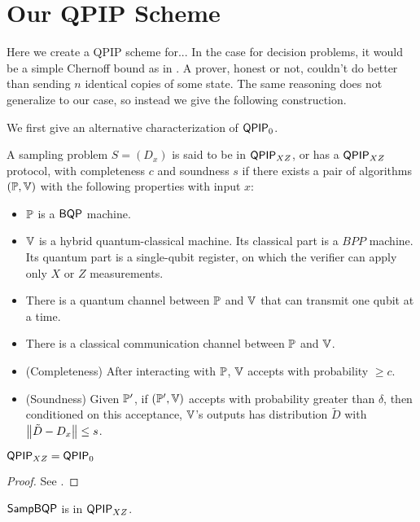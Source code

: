 \section{Our QPIP Scheme}

Here we create a QPIP scheme for...  In the case for decision problems, it would be a simple Chernoff bound as in \cite{kitaev2002classical}. A prover, honest or not, couldn't do better than sending $n$ identical copies of some state. The same reasoning does not generalize to our case, so instead we give the following construction.

We first give an alternative characterization of $\operatorname{\mathsf{QPIP}}_0$.

\begin{definition}
	A sampling problem $S=(D_x)$ is said to be in $\operatorname{\mathsf{QPIP}}_{XZ}$, or has a $\operatorname{\mathsf{QPIP}}_{XZ}$ protocol,  with completeness $c$ and soundness $s$ if there exists a pair of algorithms $(\mathbb{P}, \mathbb{V})$ with the following properties with input $x$:
	\begin{itemize}
		\item $\mathbb{P}$ is a $\operatorname{\mathsf{BQP}}$ machine.
		\item $\mathbb{V}$ is a hybrid quantum-classical machine. Its classical part is a $BPP$ machine. Its quantum part is a single-qubit register, on which the verifier can apply only $X$ or $Z$ measurements.
		\item There is a quantum channel between $\mathbb{P}$ and $\mathbb{V}$ that can transmit one qubit at a time.
		\item There is a classical communication channel between $\mathbb{P}$ and $\mathbb{V}$.
		\item (Completeness) After interacting with $\mathbb{P}$, $\mathbb{V}$ accepts with probability $\geq c$.
		\item (Soundness) Given $\mathbb{P}'$, if $(\mathbb{P}', \mathbb{V})$ accepts with probability greater than $\delta$, then conditioned on this acceptance, $\mathbb{V}$'s outputs has distribution $\tilde{D}$ with $\left\lVert\tilde{D}-D_x\right\rVert\leq s$.
	\end{itemize}
\end{definition}

\begin{theorem}
	$\operatorname{\mathsf{QPIP}}_{XZ}=\operatorname{\mathsf{QPIP}}_0$
\end{theorem}
\begin{proof}
	See \cite{mahadev_delegation}.
\end{proof}

\begin{theorem}
	$\operatorname{\mathsf{SampBQP}}$ is in $\operatorname{\mathsf{QPIP}}_{XZ}$.
\end{theorem}

